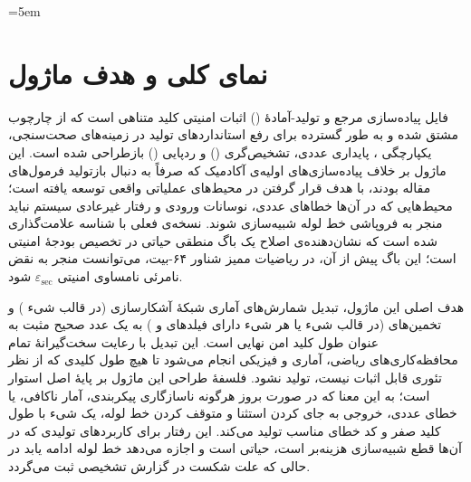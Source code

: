 \sloppy
\emergencystretch=5em

\section{نمای کلی و هدف ماژول}

فایل  پیاده‌سازی مرجع و تولید-آمادۀ () اثبات امنیتی کلید متناهی  است که از چارچوب  مشتق شده و به طور گسترده برای رفع استانداردهای تولید در زمینه‌های صحت‌سنجی، یکپارچگی ، پایداری عددی، تشخیص‌گری () و ردپایی () بازطراحی شده است. این ماژول بر خلاف پیاده‌سازی‌های اولیه‌ی آکادمیک که صرفاً به دنبال بازتولید فرمول‌های مقاله بودند، با هدف قرار گرفتن در محیط‌های عملیاتی واقعی توسعه یافته است؛ محیط‌هایی که در آن‌ها خطاهای عددی، نوسانات ورودی و رفتار غیرعادی سیستم نباید منجر به فروپاشی خط لوله شبیه‌سازی شوند. نسخه‌ی فعلی با شناسه  علامت‌گذاری شده است که نشان‌دهنده‌ی اصلاح یک باگ منطقی حیاتی در تخصیص بودجۀ امنیتی است؛ این باگ پیش از آن، در ریاضیات ممیز شناور ۶۴-بیت، می‌توانست منجر به نقض نامرئی نامساوی امنیتی $\varepsilon_{\text{sec}}$ شود.

هدف اصلی این ماژول، تبدیل شمارش‌های آماری شبکۀ آشکارسازی (در قالب شیء ) و تخمین‌های  (در قالب شیء  یا هر شیء دارای فیلدهای  و ) به یک عدد صحیح مثبت به عنوان طول کلید امن نهایی است. این تبدیل با رعایت سخت‌گیرانۀ تمام محافظه‌کاری‌های ریاضی، آماری و فیزیکی انجام می‌شود تا هیچ طول کلیدی که از نظر تئوری قابل اثبات نیست، تولید نشود. فلسفۀ طراحی این ماژول بر پایۀ اصل  استوار است؛ به این معنا که در صورت بروز هرگونه ناسازگاری پیکربندی، آمار ناکافی، یا خطای عددی، خروجی به جای  کردن استثنا و متوقف کردن خط لوله، یک شیء  با طول کلید صفر و کد خطای مناسب تولید می‌کند. این رفتار برای کاربردهای تولیدی که در آن‌ها قطع شبیه‌سازی هزینه‌بر است، حیاتی است و اجازه می‌دهد خط لوله ادامه یابد در حالی که علت شکست در گزارش تشخیصی ثبت می‌گردد.

